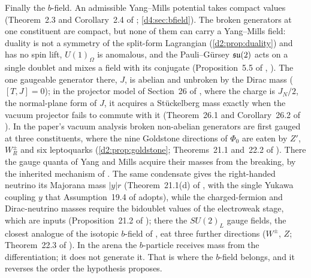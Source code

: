 Finally the $b$-field. An admissible Yang--Mills potential takes compact values (Theorem~2.3 and Corollary~2.4 of \cite{ES17};
\cref{d4:sec:bfield}). The broken generators at one constituent are compact, but none of them can carry a Yang--Mills field: duality is not a
symmetry of the split-form Lagrangian (\cref{d2:prop:duality}) and has no spin lift, $U(1)_\Omega$ is anomalous, and the Pauli--G\"ursey $\mathfrak{su}(2)$ acts
on a single doublet and mixes a field with its conjugate (Proposition~5.5 of \cite{ES17}, \cite{Witten82}). The one gaugeable generator there, $J$,
is abelian and unbroken by the Dirac mass ($[T,J]=0$); in the projector model of Section~26 of \cite{ES17}, where the charge is $J_N/2$, the
normal-plane form of $J$, it acquires a St\"uckelberg mass exactly when the vacuum projector fails to commute with it (Theorem~26.1 and
Corollary~26.2 of \cite{ES17}). In the paper's vacuum analysis broken non-abelian generators are first gauged at three constituents, where the nine
Goldstone directions of $\Phi_0$ are eaten by $Z'$, $W_R^\pm$ and six leptoquarks (\cref{d2:prop:goldstone}; Theorems~21.1 and~22.2 of \cite{ES17}).
There the gauge quanta of Yang and Mills \cite{YangMills54} acquire their masses from the breaking, by the inherited mechanism of
\cite{EnglertBrout64,Higgs64}. The same condensate gives the right-handed neutrino its Majorana mass $|y|r$ (Theorem~21.1(d) of \cite{ES17}, with
the single Yukawa coupling $y$ that Assumption~19.4 of \cite{ES17} adopts), while the charged-fermion and Dirac-neutrino masses require the
bidoublet values of the electroweak stage, which are inputs (Proposition~21.2 of \cite{ES17}); there the $SU(2)_L$ gauge fields, the closest
analogue of the isotopic $b$-field of \cite{YangMills54}, eat three further directions ($W^\pm$, $Z$; Theorem~22.3 of \cite{ES17}). In the arena the
$b$-particle receives mass from the differentiation; it does not generate it. That is where the $b$-field belongs, and it reverses the order the
hypothesis proposes.
